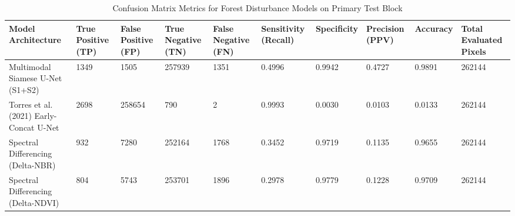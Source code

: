 \begin{table}[htbp]
\centering
\caption{Confusion Matrix Metrics for Forest Disturbance Models on Primary Test Block}
\label{tab:forest_cm}
\begin{tabular}{llllllllll}
\hline
\textbf{Model Architecture} & \textbf{True Positive (TP)} & \textbf{False Positive (FP)} & \textbf{True Negative (TN)} & \textbf{False Negative (FN)} & \textbf{Sensitivity (Recall)} & \textbf{Specificity} & \textbf{Precision (PPV)} & \textbf{Accuracy} & \textbf{Total Evaluated Pixels} \\
\hline
Multimodal Siamese U-Net (S1+S2) & 1349 & 1505 & 257939 & 1351 & 0.4996 & 0.9942 & 0.4727 & 0.9891 & 262144 \\
Torres et al. (2021) Early-Concat U-Net & 2698 & 258654 & 790 & 2 & 0.9993 & 0.0030 & 0.0103 & 0.0133 & 262144 \\
Spectral Differencing (Delta-NBR) & 932 & 7280 & 252164 & 1768 & 0.3452 & 0.9719 & 0.1135 & 0.9655 & 262144 \\
Spectral Differencing (Delta-NDVI) & 804 & 5743 & 253701 & 1896 & 0.2978 & 0.9779 & 0.1228 & 0.9709 & 262144 \\
\hline
\end{tabular}
\end{table}